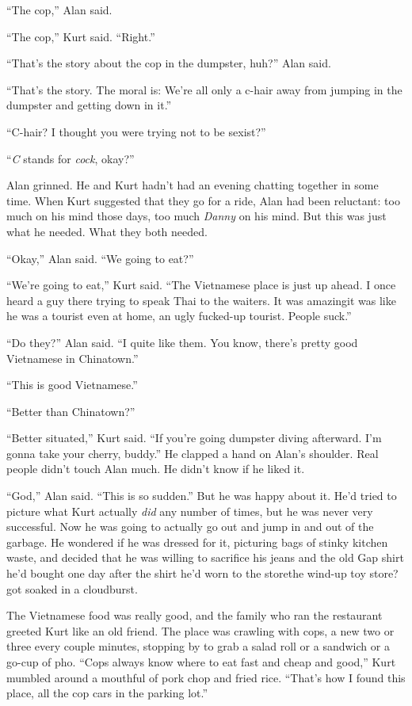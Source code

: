 ``The cop,'' Alan said.

``The cop,'' Kurt said.  ``Right.''

``That's the story about the cop in the dumpster, huh?'' Alan said.

``That's the story.  The moral is:  We're all only a c-hair away from
jumping in the dumpster and getting down in it.''

``C-hair?  I thought you were trying not to be sexist?''

``\textit{C} stands for \textit{cock}, okay?''

Alan grinned.  He and Kurt hadn't had an evening chatting together in
some time.  When Kurt suggested that they go for a ride, Alan had been
reluctant:  too much on his mind those days, too much \textit{Danny}
on his mind.  But this was just what he needed.  What they both
needed.

``Okay,'' Alan said.  ``We going to eat?''

``We're going to eat,'' Kurt said.  ``The Vietnamese place is just up
ahead.  I once heard a guy there trying to speak Thai to the waiters. 
It was amazing\dash{}it was like he was a tourist even at home, an ugly
fucked-up tourist.  People suck.''

``Do they?'' Alan said.  ``I quite like them.  You know, there's
pretty good Vietnamese in Chinatown.''

``This is good Vietnamese.''

``Better than Chinatown?''

``Better situated,'' Kurt said.  ``If you're going dumpster diving
afterward.  I'm gonna take your cherry, buddy.'' He clapped a hand on
Alan's shoulder.  Real people didn't touch Alan much.  He didn't know
if he liked it.

``God,'' Alan said.  ``This is so sudden.'' But he was happy about it. 
He'd tried to picture what Kurt actually \textit{did} any number of
times, but he was never very successful.  Now he was going to actually
go out and jump in and out of the garbage.  He wondered if he was
dressed for it, picturing bags of stinky kitchen waste, and decided
that he was willing to sacrifice his jeans and the old Gap shirt he'd
bought one day after the shirt he'd worn to the store\dash{}the wind-up
toy store?\dash{}got soaked in a cloudburst.

The Vietnamese food was really good, and the family who ran the
restaurant greeted Kurt like an old friend.  The place was crawling
with cops, a new two or three every couple minutes, stopping by to
grab a salad roll or a sandwich or a go-cup of pho.  ``Cops always
know where to eat fast and cheap and good,'' Kurt mumbled around a
mouthful of pork chop and fried rice.  ``That's how I found this
place, all the cop cars in the parking lot.''

